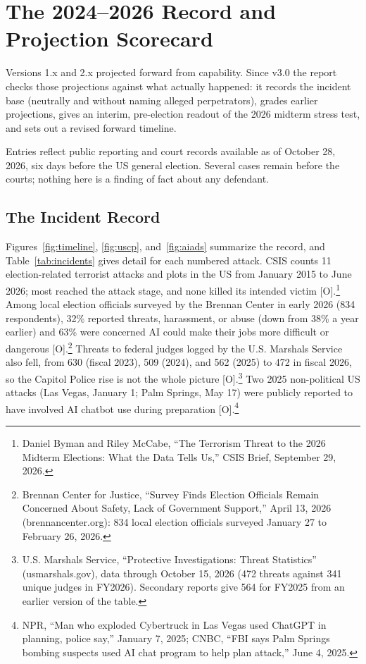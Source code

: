 \documentclass[11pt,letterpaper]{article}
\begin{document}
\vspace{0.8cm}

\section{The 2024--2026 Record and Projection Scorecard}

Versions 1.x and 2.x projected forward from capability. Since v3.0 the report checks those projections against what actually happened: it records the incident base (neutrally and without naming alleged perpetrators), grades earlier projections, gives an interim, pre-election readout of the 2026 midterm stress test, and sets out a revised forward timeline.

\begin{infobox}
Entries reflect public reporting and court records available as of October 28, 2026, six days before the US general election. Several cases remain before the courts; nothing here is a finding of fact about any defendant.
\end{infobox}

\subsection{The Incident Record}

Figures~\ref{fig:timeline}, \ref{fig:uscp}, and~\ref{fig:aiads} summarize the record, and Table~\ref{tab:incidents} gives detail for each numbered attack. CSIS counts 11 election-related terrorist attacks and plots in the US from January 2015 to June 2026; most reached the attack stage, and none killed its intended victim [O].\footnote{Daniel Byman and Riley McCabe, ``The Terrorism Threat to the 2026 Midterm Elections: What the Data Tells Us,'' CSIS Brief, September 29, 2026.} Among local election officials surveyed by the Brennan Center in early 2026 (834 respondents), 32\% reported threats, harassment, or abuse (down from 38\% a year earlier) and 63\% were concerned AI could make their jobs more difficult or dangerous [O].\footnote{Brennan Center for Justice, ``Survey Finds Election Officials Remain Concerned About Safety, Lack of Government Support,'' April 13, 2026 (brennancenter.org): 834 local election officials surveyed January 27 to February 26, 2026.} Threats to federal judges logged by the U.S. Marshals Service also fell, from 630 (fiscal 2023), 509 (2024), and 562 (2025) to 472 in fiscal 2026, so the Capitol Police rise is not the whole picture [O].\footnote{U.S. Marshals Service, ``Protective Investigations: Threat Statistics'' (usmarshals.gov), data through October 15, 2026 (472 threats against 341 unique judges in FY2026). Secondary reports give 564 for FY2025 from an earlier version of the table.} Two 2025 non-political US attacks (Las Vegas, January 1; Palm Springs, May 17) were publicly reported to have involved AI chatbot use during preparation [O].\footnote{NPR, ``Man who exploded Cybertruck in Las Vegas used ChatGPT in planning, police say,'' January 7, 2025; CNBC, ``FBI says Palm Springs bombing suspects used AI chat program to help plan attack,'' June 4, 2025.}
\end{document}
